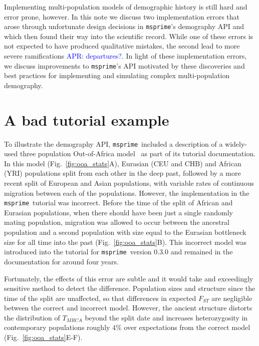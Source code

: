 \documentclass{article}
\newcommand{\msprime}[0]{\texttt{msprime}}
\newcommand{\aprcomment}[1]{{\textcolor{blue}{APR: #1}}}
\begin{document}
Implementing multi-population models of demographic history is still hard and error
prone, however. In this note we discuss two implementation errors that arose through
unfortunate design decisions in \msprime's demography API and which then found their way
into the scientific record. While one of these errors is not expected to have produced qualitative
mistakes, the second lead to more severe ramifications \aprcomment{departures?}. In light of these
implementation errors, we discuss improvements to \msprime's API motivated by these
discoveries and best practices for implementing and simulating complex multi-population
demography.

\section{A bad tutorial example}

To illustrate the demography API, \msprime\ included a description of a widely-used
three population Out-of-Africa model~\citep{gutenkunst2009inferring}
as part of its tutorial documentation. In this model (Fig.~\ref{fig:ooa_stats}A),
Eurasian (CEU and CHB) and African (YRI) populations split from each other in the deep past,
followed by a more recent split of European and Asian populations, with variable rates of
continuous migration between each of the populations. However, the implementation in the
\msprime\ tutorial was incorrect. Before the time of the split of African and Eurasian
populations, when there should have been just a single randomly mating population, migration was
allowed to occur between the ancestral population and a second population with size equal to
the Eurasian bottleneck size for all time into the past
(Fig.~\ref{fig:ooa_stats}B). This incorrect model was introduced into
the tutorial for \msprime\ version 0.3.0 and remained in the documentation for
around four years.

Fortunately, the effects of this error are subtle and it would take
and exceedingly sensitive method to detect the difference.
Population sizes and structure since the time of
the split are unaffected, so that differences in expected $F_{ST}$ are negligible between
the correct and incorrect model. However, the ancient structure distorts the distribution
of $T_{MRCA}$ beyond the split date and increases
heterozygosity in contemporary populations roughly $4\%$ over expectations
from the correct model (Fig.~\ref{fig:ooa_stats}E-F).
\end{document}
